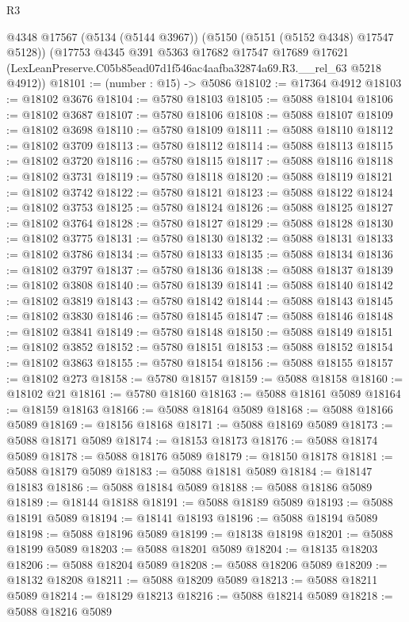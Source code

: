 \begin{lexlean}{R3}
\begin{coremodule}
    @4348
    @17567
    (@5134 (@5144 @3967))
    (@5150 (@5151 (@5152 @4348) @17547 @5128))
    (@17753
      @4345
      @391
      @5363
      @17682
      @17547
      @17689
      @17621
      (LexLeanPreserve.C05b85ead07d1f546ac4aafba32874a69.R3.__rel_63 @5218 @4912))
@18101 := (number : @15) -> @5086
@18102 := @17364 @4912
@18103 := @18102 @3676
@18104 := @5780 @18103
@18105 := @5088 @18104
@18106 := @18102 @3687
@18107 := @5780 @18106
@18108 := @5088 @18107
@18109 := @18102 @3698
@18110 := @5780 @18109
@18111 := @5088 @18110
@18112 := @18102 @3709
@18113 := @5780 @18112
@18114 := @5088 @18113
@18115 := @18102 @3720
@18116 := @5780 @18115
@18117 := @5088 @18116
@18118 := @18102 @3731
@18119 := @5780 @18118
@18120 := @5088 @18119
@18121 := @18102 @3742
@18122 := @5780 @18121
@18123 := @5088 @18122
@18124 := @18102 @3753
@18125 := @5780 @18124
@18126 := @5088 @18125
@18127 := @18102 @3764
@18128 := @5780 @18127
@18129 := @5088 @18128
@18130 := @18102 @3775
@18131 := @5780 @18130
@18132 := @5088 @18131
@18133 := @18102 @3786
@18134 := @5780 @18133
@18135 := @5088 @18134
@18136 := @18102 @3797
@18137 := @5780 @18136
@18138 := @5088 @18137
@18139 := @18102 @3808
@18140 := @5780 @18139
@18141 := @5088 @18140
@18142 := @18102 @3819
@18143 := @5780 @18142
@18144 := @5088 @18143
@18145 := @18102 @3830
@18146 := @5780 @18145
@18147 := @5088 @18146
@18148 := @18102 @3841
@18149 := @5780 @18148
@18150 := @5088 @18149
@18151 := @18102 @3852
@18152 := @5780 @18151
@18153 := @5088 @18152
@18154 := @18102 @3863
@18155 := @5780 @18154
@18156 := @5088 @18155
@18157 := @18102 @273
@18158 := @5780 @18157
@18159 := @5088 @18158
@18160 := @18102 @21
@18161 := @5780 @18160
@18163 := @5088 @18161 @5089
@18164 := @18159 @18163
@18166 := @5088 @18164 @5089
@18168 := @5088 @18166 @5089
@18169 := @18156 @18168
@18171 := @5088 @18169 @5089
@18173 := @5088 @18171 @5089
@18174 := @18153 @18173
@18176 := @5088 @18174 @5089
@18178 := @5088 @18176 @5089
@18179 := @18150 @18178
@18181 := @5088 @18179 @5089
@18183 := @5088 @18181 @5089
@18184 := @18147 @18183
@18186 := @5088 @18184 @5089
@18188 := @5088 @18186 @5089
@18189 := @18144 @18188
@18191 := @5088 @18189 @5089
@18193 := @5088 @18191 @5089
@18194 := @18141 @18193
@18196 := @5088 @18194 @5089
@18198 := @5088 @18196 @5089
@18199 := @18138 @18198
@18201 := @5088 @18199 @5089
@18203 := @5088 @18201 @5089
@18204 := @18135 @18203
@18206 := @5088 @18204 @5089
@18208 := @5088 @18206 @5089
@18209 := @18132 @18208
@18211 := @5088 @18209 @5089
@18213 := @5088 @18211 @5089
@18214 := @18129 @18213
@18216 := @5088 @18214 @5089
@18218 := @5088 @18216 @5089

\end{coremodule}
\end{lexlean}
